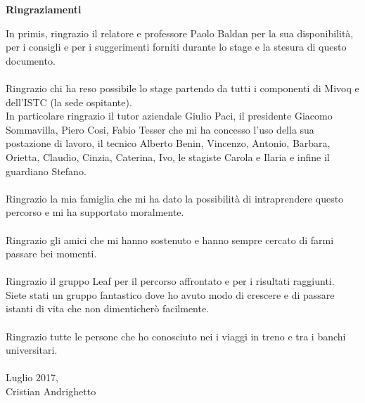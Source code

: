 \null
\vspace{2cm}
\begin{flushright}
	{\large \textbf{Ringraziamenti}}
\end{flushright}
\vfill
\begin{em}
    
	In primis, ringrazio il relatore e professore Paolo Baldan per la sua disponibilità, per i consigli e per i suggerimenti forniti durante lo stage e la stesura di questo documento.\\
	\\
	Ringrazio chi ha reso possibile lo stage partendo da tutti i componenti di Mivoq e dell'ISTC (la sede ospitante).\\
	In particolare ringrazio il tutor aziendale Giulio Paci, il presidente Giacomo Sommavilla, Piero Cosi, Fabio Tesser che mi ha concesso l'uso della sua postazione di lavoro, il tecnico Alberto Benin, Vincenzo, Antonio, Barbara, Orietta, Claudio, Cinzia, Caterina, Ivo, le stagiste Carola e Ilaria e infine il guardiano Stefano.\\
	\\
	Ringrazio la mia famiglia che mi ha dato la possibilità di intraprendere questo percorso e mi ha supportato moralmente.\\
	\\
	Ringrazio gli amici che mi hanno sostenuto e hanno sempre cercato di farmi passare bei momenti.\\
	\\
	Ringrazio il gruppo Leaf per il percorso affrontato e per i risultati raggiunti.\\
	Siete stati un gruppo fantastico dove ho avuto modo di crescere e di passare istanti di vita che non dimenticherò facilmente.\\
	\\
	Ringrazio tutte le persone che ho conosciuto nei i viaggi in treno e tra i banchi universitari.\\
	\\
	Luglio 2017,\\
	Cristian Andrighetto
\end{em}
\begin{quote}
\end{quote}
\vfill
\null